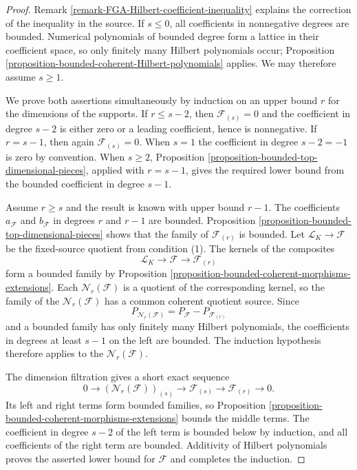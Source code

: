 \begin{proof}
Remark \ref{remark-FGA-Hilbert-coefficient-inequality} explains the correction
of the inequality in the source. If $s\leq0$, all coefficients in nonnegative
degrees are bounded. Numerical polynomials of bounded degree form a lattice
in their coefficient space, so only finitely many Hilbert polynomials occur;
Proposition \ref{proposition-bounded-coherent-Hilbert-polynomials} applies.
We may therefore assume $s\geq1$.

We prove both assertions simultaneously by induction on an upper bound $r$
for the dimensions of the supports. If $r\leq s-2$, then
$\mathcal{F}_{(s)}=0$ and the coefficient in degree $s-2$ is either zero or a
leading coefficient, hence is nonnegative. If $r=s-1$, then again
$\mathcal{F}_{(s)}=0$. When $s=1$ the coefficient in degree $s-2=-1$ is zero
by convention. When $s\geq2$, Proposition
\ref{proposition-bounded-top-dimensional-pieces}, applied with $r=s-1$,
gives the required lower bound from the bounded coefficient in degree $s-1$.

Assume $r\geq s$ and the result is known with upper bound $r-1$. The
coefficients $a_{\mathcal{F}}$ and $b_{\mathcal{F}}$ in degrees $r$ and
$r-1$ are bounded. Proposition
\ref{proposition-bounded-top-dimensional-pieces} shows that the family of
$\mathcal{F}_{(r)}$ is bounded. Let $\mathcal{L}_K\to\mathcal{F}$ be the
fixed-source quotient from condition (1). The kernels of the composites
$$
\mathcal{L}_K\longrightarrow\mathcal{F}
\longrightarrow\mathcal{F}_{(r)}
$$
form a bounded family by Proposition
\ref{proposition-bounded-coherent-morphisms-extensions}. Each
$\mathcal{N}_r(\mathcal{F})$ is a quotient of the corresponding kernel, so
the family of the $\mathcal{N}_r(\mathcal{F})$ has a common coherent quotient
source. Since
$$
P_{\mathcal{N}_r(\mathcal{F})}=P_{\mathcal{F}}-P_{\mathcal{F}_{(r)}}
$$
and a bounded family has only finitely many Hilbert polynomials, the
coefficients in degrees at least $s-1$ on the left are bounded. The induction
hypothesis therefore applies to the $\mathcal{N}_r(\mathcal{F})$.

The dimension filtration gives a short exact sequence
$$
0\longrightarrow
(\mathcal{N}_r(\mathcal{F}))_{(s)}\longrightarrow
\mathcal{F}_{(s)}\longrightarrow
\mathcal{F}_{(r)}\longrightarrow0.
$$
Its left and right terms form bounded families, so Proposition
\ref{proposition-bounded-coherent-morphisms-extensions} bounds the middle
terms. The coefficient in degree $s-2$ of the left term is bounded below by
induction, and all coefficients of the right term are bounded. Additivity of
Hilbert polynomials proves the asserted lower bound for $\mathcal{F}$ and
completes the induction.
\end{proof}

